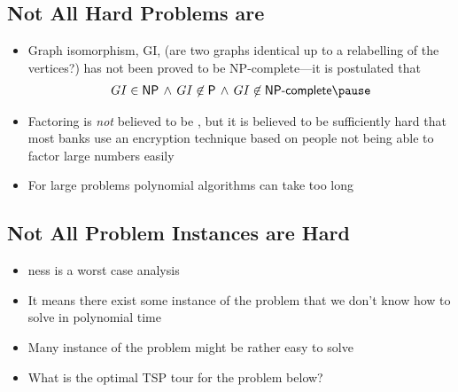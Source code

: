 
\begin{slide}
\section[-0.5]{Not All Hard Problems are }

\begin{PauseHighLight}
  \begin{itemize}
  \item Graph isomorphism, GI, (are two graphs identical up to a relabelling
    of the vertices?) has not been proved to be NP-complete---it is
    postulated that 
    \begin{align*}
      GI \in \class{NP} \,\wedge\, GI \not\in\class{P} \,\wedge\, GI
      \not\in\class{NP-complete}\pause
    \end{align*}
  \item Factoring is \textit{not} believed to be , but it
    is believed to be sufficiently hard that most banks use an
    encryption technique based on people not being able to factor large
    numbers easily\pause
  \item For large problems polynomial algorithms can take too
    long\pause
  \end{itemize}
\end{PauseHighLight}

\end{slide}


\begin{slide}
\section[-2]{Not All  Problem Instances are Hard}

\begin{PauseHighLight}
  \begin{itemize}\squeeze
  \item {}ness is a worst case analysis\pause
  \item It means there exist some instance of the problem that we don't
    know how to solve in polynomial time\pause
  \item Many instance of the problem might be rather easy to solve\pause
  \item What is the optimal TSP tour for the problem below?
    \begin{center}
      \pauseb
    \end{center}
  \end{itemize}
\end{PauseHighLight}

\end{slide}

